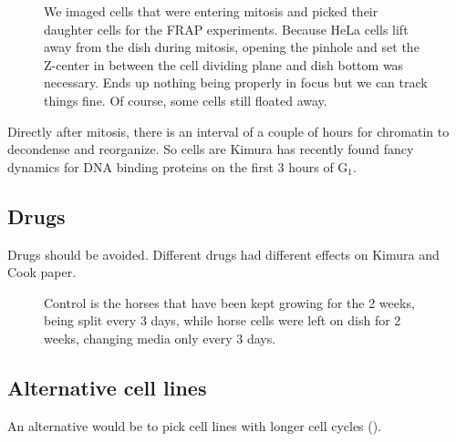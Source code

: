     \begin{figure}
      \centering
                   {We imaged cells that were entering mitosis and picked their
                    daughter cells for the FRAP experiments. Because HeLa cells lift
                    away from the dish during mitosis, opening the
                    pinhole and set the Z-center in between the cell dividing plane
                    and dish bottom was necessary. Ends up nothing being properly in focus but we
                    can track things fine. Of course, some cells still floated away.}
      \label{fig:picking-cells}
    \end{figure}
    
    Directly after mitosis, there is an interval of a couple of 
    hours for chromatin to decondense and reorganize\addref. So cells are
    Kimura has recently found fancy dynamics for DNA binding proteins  on the first 3 hours of G$_1$\addref.
    

  \subsection{Drugs}
  
    Drugs should be avoided. Different drugs had different effects on Kimura and Cook paper.

    \begin{figure}
      \centering
                   {Control is the horses that have been kept growing for the 2 weeks,
                    being split every 3 days, while horse cells were left on dish for
                    2 weeks, changing media only every 3 days.}
    \end{figure}

  \subsection{Alternative cell lines}
  
    An alternative would be to pick cell lines with longer cell cycles ().
    
